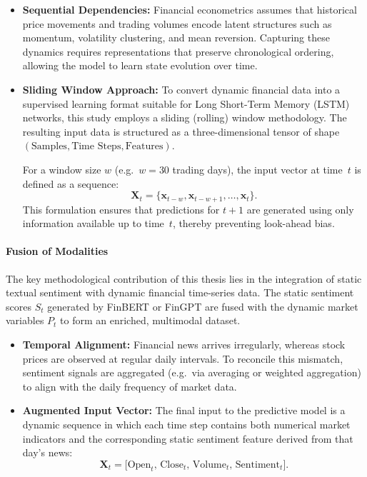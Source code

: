 \documentclass[singlespace]{ucetd}
\begin{document}
\begin{itemize}
    \item \textbf{Sequential Dependencies:}  
    Financial econometrics assumes that historical price movements and trading volumes encode latent structures such as momentum, volatility clustering, and mean reversion. Capturing these dynamics requires representations that preserve chronological ordering, allowing the model to learn state evolution over time.

    \item \textbf{Sliding Window Approach:}  
    To convert dynamic financial data into a supervised learning format suitable for Long Short-Term Memory (LSTM) networks, this study employs a sliding (rolling) window methodology. The resulting input data is structured as a three-dimensional tensor of shape $(\text{Samples}, \text{Time Steps}, \text{Features})$.
    
    For a window size $w$ (e.g.\ $w=30$ trading days), the input vector at time~$t$ is defined as a sequence:
    \[
        \mathbf{X}_t = \{ \mathbf{x}_{t-w}, \mathbf{x}_{t-w+1}, \dots, \mathbf{x}_{t} \}.
    \]
    This formulation ensures that predictions for $t+1$ are generated using only information available up to time~$t$, thereby preventing look-ahead bias.
\end{itemize}

\paragraph{Fusion of Modalities}

The key methodological contribution of this thesis lies in the integration of static textual sentiment with dynamic financial time-series data. The static sentiment scores $S_t$ generated by FinBERT or FinGPT are fused with the dynamic market variables $P_t$ to form an enriched, multimodal dataset.

\begin{itemize}
    \item \textbf{Temporal Alignment:}  
    Financial news arrives irregularly, whereas stock prices are observed at regular daily intervals. To reconcile this mismatch, sentiment signals are aggregated (e.g.\ via averaging or weighted aggregation) to align with the daily frequency of market data.

    \item \textbf{Augmented Input Vector:}  
    The final input to the predictive model is a dynamic sequence in which each time step contains both numerical market indicators and the corresponding static sentiment feature derived from that day’s news:
    \[
        \mathbf{X}_t =
        \big[
        \text{Open}_t,\,
        \text{Close}_t,\,
        \text{Volume}_t,\,
        \text{Sentiment}_t
        \big].
    \]
\end{itemize}
\end{document}
